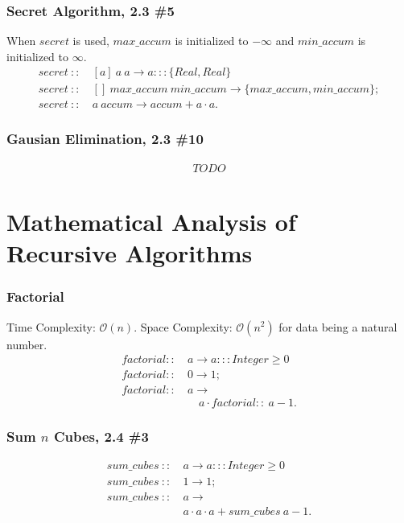 \documentclass[a4paper,10pt]{book}
\begin{document}
\subsubsection{Secret Algorithm, 2.3 \#5}

When $secret$ is used, $max\_accum$ is initialized to $-\infty$ and $min\_accum$ is initialized to $\infty$.
\begin{align*}
secret\ ::\ &[a]\ a\ a\rightarrow a:::\{Real,Real\}\\
secret\ ::\ &[]\ max\_accum\ min\_accum\rightarrow \{max\_accum,min\_accum\};\\
secret\ ::\ &a\ accum\rightarrow accum+ a\cdot a.
\end{align*}

\subsubsection{Gausian Elimination, 2.3 \#10}

\begin{align*}
TO DO
\end{align*}
\section{Mathematical Analysis of Recursive Algorithms}

\subsubsection{Factorial}
Time Complexity: $\mathcal{O}(n)$. Space Complexity: $\mathcal{O}(n^2)$ for data being a natural number.
\begin{align*}
factorial ::\ &a\rightarrow a:::Integer\ge 0\\
factorial ::\ &0 \rightarrow 1;\\
factorial ::\ &a\rightarrow\\
       &\quad a\cdot factorial ::\ a-1.
\end{align*}

\subsubsection{Sum $n$ Cubes, 2.4 \#3}

\begin{align*}
sum\_cubes\ ::\ &a\rightarrow a:::Integer\ge 0\\
sum\_cubes\ ::\ &1\rightarrow 1;\\
sum\_cubes\ ::\ &a\rightarrow\\
	&a\cdot a\cdot a+sum\_cubes\ a-1.
\end{align*}
\end{document}
